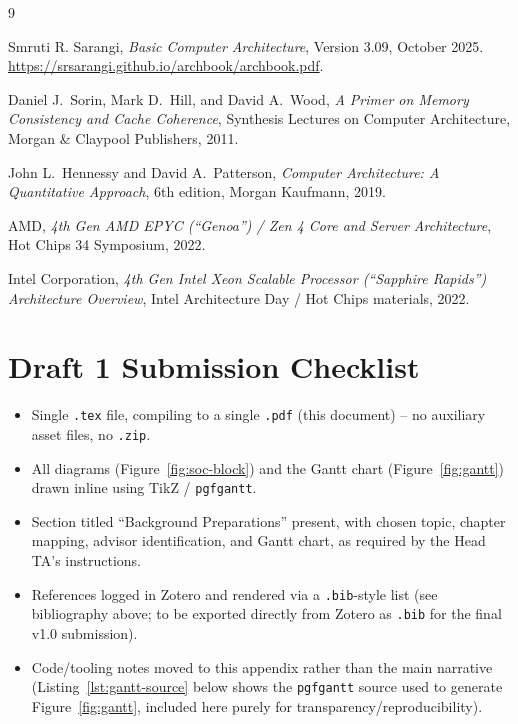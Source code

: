 \documentclass[11pt,a4paper]{article}
\begin{document}
\newpage
\begin{thebibliography}{9}

Smruti R. Sarangi, \emph{Basic Computer Architecture}, Version 3.09, October 2025.
\url{https://srsarangi.github.io/archbook/archbook.pdf}.

Daniel J.\ Sorin, Mark D.\ Hill, and David A.\ Wood, \emph{A Primer on Memory Consistency and
Cache Coherence}, Synthesis Lectures on Computer Architecture, Morgan \& Claypool Publishers,
2011.

John L.\ Hennessy and David A.\ Patterson, \emph{Computer Architecture: A Quantitative
Approach}, 6th edition, Morgan Kaufmann, 2019.

AMD, \emph{4th Gen AMD EPYC (``Genoa'') / Zen 4 Core and Server Architecture}, Hot Chips 34
Symposium, 2022.

Intel Corporation, \emph{4th Gen Intel Xeon Scalable Processor (``Sapphire Rapids'')
Architecture Overview}, Intel Architecture Day / Hot Chips materials, 2022.

\end{thebibliography}

\appendix
\section{Draft 1 Submission Checklist}

\begin{itemize}[nosep]
  \item[$\square$] Single \texttt{.tex} file, compiling to a single \texttt{.pdf}
        (this document) -- no auxiliary asset files, no \texttt{.zip}.
  \item[$\square$] All diagrams (Figure~\ref{fig:soc-block}) and the Gantt chart
        (Figure~\ref{fig:gantt}) drawn inline using TikZ / \texttt{pgfgantt}.
  \item[$\square$] Section titled ``Background Preparations'' present, with chosen topic,
        chapter mapping, advisor identification, and Gantt chart, as required by the
        Head TA's instructions.
  \item[$\square$] References logged in Zotero and rendered via a \texttt{.bib}-style list
        (see bibliography above; to be exported directly from Zotero as \texttt{.bib} for the
        final v1.0 submission).
  \item[$\square$] Code/tooling notes moved to this appendix rather than the main narrative
        (Listing~\ref{lst:gantt-source} below shows the \texttt{pgfgantt} source used to
        generate Figure~\ref{fig:gantt}, included here purely for transparency/reproducibility).
\end{itemize}
\end{document}
